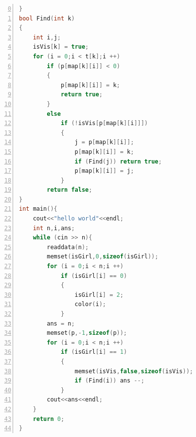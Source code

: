 \documentclass{ctexart}
\begin{document}
\begin{CJK*}{GBK}{song}
\begin{lstlisting}[frame=single,
                    framerule=1pt,
                    numbers=left,
                    language={C++},
                    firstnumber=0,caption={Sample c++ source code}]
}
bool Find(int k)
{
	int i,j;
	isVis[k] = true;
	for (i = 0;i < t[k];i ++)
		if (p[map[k][i]] < 0)
		{
			p[map[k][i]] = k;
			return true;
		}
		else
			if (!isVis[p[map[k][i]]])
			{
				j = p[map[k][i]];
				p[map[k][i]] = k;
				if (Find(j)) return true;
				p[map[k][i]] = j;
			}
		return false;
}
int main(){
    cout<<"hello world"<<endl;
	int n,i,ans;
	while (cin >> n){
		readdata(n);
		memset(isGirl,0,sizeof(isGirl));
		for (i = 0;i < n;i ++)
			if (isGirl[i] == 0)
			{
				isGirl[i] = 2;
				color(i);
			}
		ans = n;
		memset(p,-1,sizeof(p));
		for (i = 0;i < n;i ++)
		    if (isGirl[i] == 1)
			{
				memset(isVis,false,sizeof(isVis));				
				if (Find(i)) ans --;
			}
		cout<<ans<<endl;
	}
	return 0;
}
\end{lstlisting}






\end{CJK*}
\end{document}
